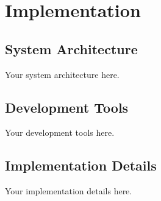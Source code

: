 \chapter{Implementation}
\section{System Architecture}
Your system architecture here.
\section{Development Tools}
Your development tools here.
\section{Implementation Details}
Your implementation details here.
